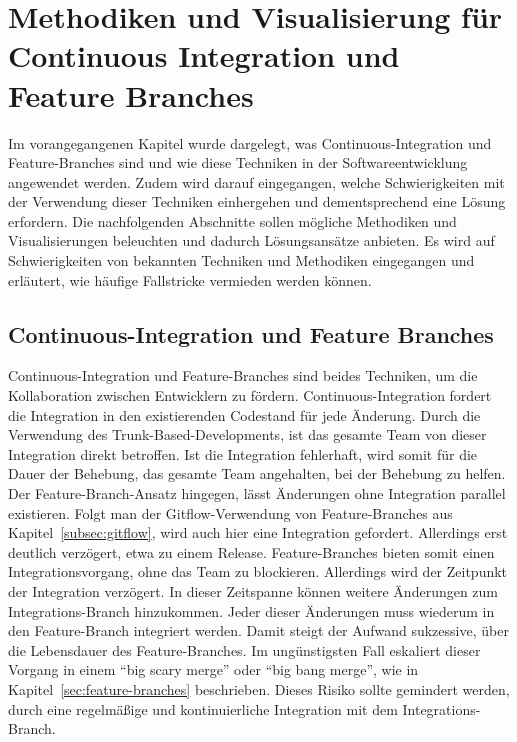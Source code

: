 \chapter[Methodiken und Visualisierung]{Methodiken und Visualisierung für Continuous Integration und Feature Branches}
\label{ch:visu_meth}

Im vorangegangenen Kapitel wurde dargelegt, was Continuous-Integration und Feature-Branches sind und wie diese Techniken in der Softwareentwicklung angewendet werden. Zudem wird darauf eingegangen, welche Schwierigkeiten mit der Verwendung dieser Techniken einhergehen und dementsprechend eine Lösung erfordern. 
Die nachfolgenden Abschnitte sollen mögliche Methodiken und Visualisierungen beleuchten und dadurch Lösungsansätze anbieten. Es wird auf Schwierigkeiten von bekannten Techniken und Methodiken eingegangen und erläutert, wie häufige Fallstricke vermieden werden können.

\section{Continuous-Integration und Feature Branches}

Continuous-Integration und Feature-Branches sind beides Techniken, um die Kollaboration zwischen Entwicklern zu fördern. Continuous-Integration fordert die Integration in den existierenden Codestand für jede Änderung. Durch die Verwendung des Trunk-Based-Developments, ist das gesamte Team von dieser Integration direkt betroffen. Ist die Integration fehlerhaft, wird somit für die Dauer der Behebung, das gesamte Team angehalten, bei der Behebung zu helfen. Der Feature-Branch-Ansatz hingegen, lässt Änderungen ohne Integration parallel existieren. Folgt man der Gitflow-Verwendung von Feature-Branches aus Kapitel~\ref{subsec:gitflow}, wird auch hier eine Integration gefordert. Allerdings erst deutlich verzögert, etwa zu einem Release. Feature-Branches bieten somit einen Integrationsvorgang, ohne das Team zu blockieren. Allerdings wird der Zeitpunkt der Integration verzögert. In dieser Zeitspanne können weitere Änderungen zum Integrations-Branch hinzukommen. Jeder dieser Änderungen muss wiederum in den Feature-Branch integriert werden. Damit steigt der Aufwand sukzessive, über die Lebensdauer des Feature-Branches. Im ungünstigsten Fall eskaliert dieser Vorgang in einem ``big scary merge'' oder ``big bang merge'', wie in Kapitel~\ref{sec:feature-branches} beschrieben. Dieses Risiko sollte gemindert werden, durch eine regelmäßige und kontinuierliche Integration mit dem Integrations-Branch.\\

